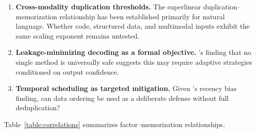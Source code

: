 \documentclass[11pt]{article}
\begin{document}
\begin{enumerate}[nosep]
  \item \textbf{Cross-modality duplication thresholds.} The superlinear
    duplication--memorization relationship has been established primarily for
    natural language.
    Whether code, structured data, and multimodal inputs exhibit the same
    scaling exponent remains untested.
  \item \textbf{Leakage-minimizing decoding as a formal objective.}
    \citet{tiwari2025sequencelevelleakagerisktraining}'s finding that no single
    method is universally safe suggests this may require adaptive strategies
    conditioned on output confidence.
  \item \textbf{Temporal scheduling as targeted mitigation.}
    Given \citet{jagielski2023measuring}'s recency bias finding, can data
    ordering be used as a deliberate defense without full deduplication?
\end{enumerate}

Table~\ref{table:correlations} summarizes factor--memorization relationships.

\begin{table}[ht]
\centering
\small
{}
\caption{Factor--memorization correlations.}
\label{table:correlations}
\end{table}
\end{document}
